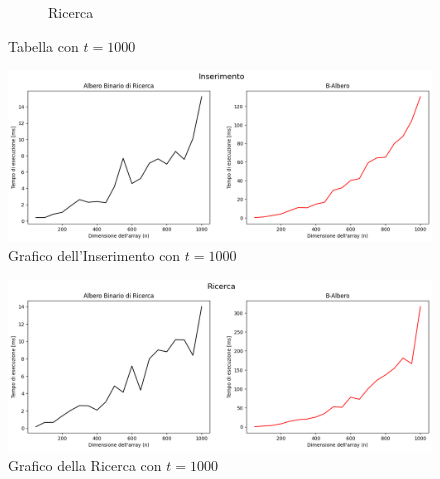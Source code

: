 \begin{figure}[H]
\begin{subfigure}[b]{0.49\textwidth}
        \caption{Ricerca}
        \label{fig:tablesearchtimet1000}
    \end{subfigure}
    \caption{Tabella con $t=1000$}
    \label{fig:tabletimest1000}
\end{figure}

\begin{figure}[H]
    \centering
    \includegraphics[width=\textwidth]{side-graphs/insert-ms-t1000.png}
    \caption{Grafico dell'Inserimento con $t=1000$}
    \label{fig:sidegraphinserttimet1000}
\end{figure}
    
\begin{figure}[H]
    \centering
    \includegraphics[width=\textwidth]{side-graphs/search-ms-t1000.png}
    \caption{Grafico della Ricerca con $t=1000$}
    \label{fig:sidegraphsearchtimet1000}
\end{figure}

